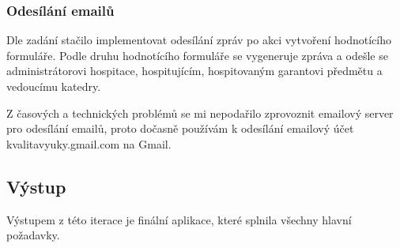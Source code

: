 \subsubsection{Odesílání emailů}
Dle zadání stačilo implementovat odesílání zpráv po akci vytvoření hodnotícího formuláře. Podle druhu hodnotícího formuláře se vygeneruje zpráva a odešle se administrátorovi hospitace, hospitujícím, hospitovaným garantovi předmětu a vedoucímu katedry. 

Z časových a technických problémů se mi nepodařilo zprovoznit emailový server pro odesílání emailů, proto dočasně používám k odesílání emailový účet kvalitavyuky.gmail.com na Gmail.

\subsection{Výstup}
Výstupem z této iterace je finální aplikace, které splnila všechny hlavní požadavky. 